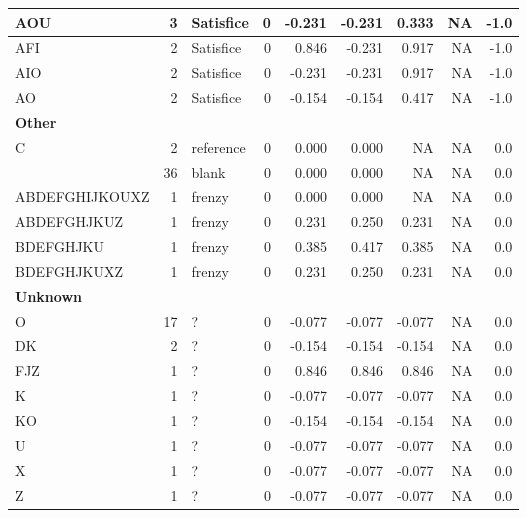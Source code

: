 \documentclass[
  letterpaper,
  DIV=11,
  numbers=noendperiod]{scrreprt}
\begin{document}
\begin{tabular}[t]{l|r|l|r|r|r|r|r|r}
\hline
\hspace{1em}AOU & 3 & Satisfice & 0 & -0.231 & -0.231 & 0.333 & NA & -1.0\\
\hline
\hspace{1em}AFI & 2 & Satisfice & 0 & 0.846 & -0.231 & 0.917 & NA & -1.0\\
\hline
\hspace{1em}AIO & 2 & Satisfice & 0 & -0.231 & -0.231 & 0.917 & NA & -1.0\\
\hline
\hspace{1em}AO & 2 & Satisfice & 0 & -0.154 & -0.154 & 0.417 & NA & -1.0\\
\hline
\multicolumn{9}{l}{\textbf{Other}}\\
\hline
\hspace{1em}C & 2 & reference & 0 & 0.000 & 0.000 & NA & NA & 0.0\\
\hline
\hspace{1em} & 36 & blank & 0 & 0.000 & 0.000 & NA & NA & 0.0\\
\hline
\hspace{1em}ABDEFGHIJKOUXZ & 1 & frenzy & 0 & 0.000 & 0.000 & NA & NA & 0.0\\
\hline
\hspace{1em}ABDEFGHJKUZ & 1 & frenzy & 0 & 0.231 & 0.250 & 0.231 & NA & 0.0\\
\hline
\hspace{1em}BDEFGHJKU & 1 & frenzy & 0 & 0.385 & 0.417 & 0.385 & NA & 0.0\\
\hline
\hspace{1em}BDEFGHJKUXZ & 1 & frenzy & 0 & 0.231 & 0.250 & 0.231 & NA & 0.0\\
\hline
\multicolumn{9}{l}{\textbf{Unknown}}\\
\hline
\hspace{1em}O & 17 & ? & 0 & -0.077 & -0.077 & -0.077 & NA & 0.0\\
\hline
\hspace{1em}DK & 2 & ? & 0 & -0.154 & -0.154 & -0.154 & NA & 0.0\\
\hline
\hspace{1em}FJZ & 1 & ? & 0 & 0.846 & 0.846 & 0.846 & NA & 0.0\\
\hline
\hspace{1em}K & 1 & ? & 0 & -0.077 & -0.077 & -0.077 & NA & 0.0\\
\hline
\hspace{1em}KO & 1 & ? & 0 & -0.154 & -0.154 & -0.154 & NA & 0.0\\
\hline
\hspace{1em}U & 1 & ? & 0 & -0.077 & -0.077 & -0.077 & NA & 0.0\\
\hline
\hspace{1em}X & 1 & ? & 0 & -0.077 & -0.077 & -0.077 & NA & 0.0\\
\hline
\hspace{1em}Z & 1 & ? & 0 & -0.077 & -0.077 & -0.077 & NA & 0.0\\
\hline
\end{tabular}
\end{document}

